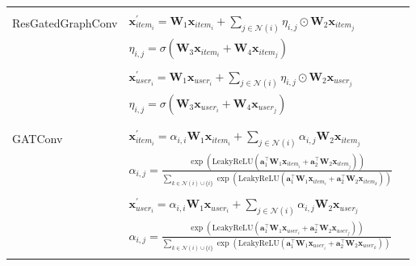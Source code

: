 \documentclass{scrartcl}
\begin{document}
\begin{appendices}
\begin{longtable}{|l|l|l|}
     & \\
    ResGatedGraphConv & $\mathbf{x}^{\prime}_{item_{i}} = \mathbf{W}_1 \mathbf{x}_{item_{i}} + \sum_{j \in \mathcal{N}(i)} \eta_{i,j} \odot \mathbf{W}_2 \mathbf{x}_{item_{j}}$\\
    & $\eta_{i,j} = \sigma(\mathbf{W}_3 \mathbf{x}_{item_{i}} + \mathbf{W}_4 \mathbf{x}_{item_{j}})$  \\
     & \\
    & $\mathbf{x}^{\prime}_{user_{i}} = \mathbf{W}_1 \mathbf{x}_{user_{i}} + \sum_{j \in \mathcal{N}(i)} \eta_{i,j} \odot \mathbf{W}_2 \mathbf{x}_{user_{j}}$\\
    & $\eta_{i,j} = \sigma(\mathbf{W}_3 \mathbf{x}_{user_{i}} + \mathbf{W}_4 \mathbf{x}_{user_{j}})$ \\
     & \\
    
    \rowcolor[gray]{0.9} & \\
    \rowcolor[gray]{0.9} GATConv & $\mathbf{x}^{\prime}_{item_{i}} = \alpha_{i,i}\mathbf{W}_{1}\mathbf{x}_{item_{i}} + \sum_{j \in \mathcal{N}(i)} \alpha_{i,j}\mathbf{W}_{2}\mathbf{x}_{item_{j}}$ \\
    \rowcolor[gray]{0.9} & $\alpha_{i,j} = \frac{\exp\left(\mathrm{LeakyReLU}\left(\mathbf{a}^{\top}_{1} \mathbf{W}_{1}\mathbf{x}_{item_{i}} + \mathbf{a}^{\top}_{2} \mathbf{W}_{2}\mathbf{x}_{item_{j}}\right)\right)}{\sum_{k \in \mathcal{N}(i) \cup \{ i \}}\exp\left(\mathrm{LeakyReLU}\left(\mathbf{a}^{\top}_{1} \mathbf{W}_{1}\mathbf{x}_{item_{i}} + \mathbf{a}^{\top}_{2}\mathbf{W}_{2}\mathbf{x}_{item_{k}}\right)\right)}$ \\
    \rowcolor[gray]{0.9} & \\
    \rowcolor[gray]{0.9} & $\mathbf{x}^{\prime}_{user_{i}} = \alpha_{i,i}\mathbf{W}_{1}\mathbf{x}_{user_{i}} + \sum_{j \in \mathcal{N}(i)} \alpha_{i,j}\mathbf{W}_{2}\mathbf{x}_{user_{j}}$ \\
    \rowcolor[gray]{0.9} & $\alpha_{i,j} = \frac{\exp\left(\mathrm{LeakyReLU}\left(\mathbf{a}^{\top}_{1} \mathbf{W}_{1}\mathbf{x}_{user_{i}} + \mathbf{a}^{\top}_{2} \mathbf{W}_{2}\mathbf{x}_{user_{j}}\right)\right)}{\sum_{k \in \mathcal{N}(i) \cup \{ i \}}\exp\left(\mathrm{LeakyReLU}\left(\mathbf{a}^{\top}_{1} \mathbf{W}_{1}\mathbf{x}_{user_{i}} + \mathbf{a}^{\top}_{2}\mathbf{W}_{2}\mathbf{x}_{user_{k}}\right)\right)}$ \\
    \rowcolor[gray]{0.9} & \\


\end{longtable}
\end{appendices}
\end{document}
